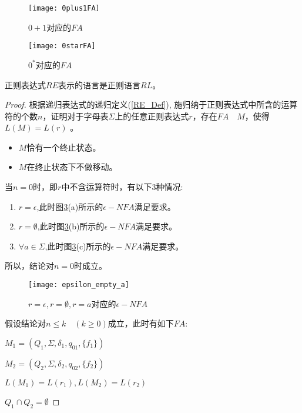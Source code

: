 \begin{figure}[htbp]
	\texttt{[image: 0plus1FA]}
	\caption{$0+1$对应的$FA$}
	\label{fig:0plus1FA}       %
\end{figure}

\begin{figure}[htbp]
	\texttt{[image: 0starFA]}
	\caption{$0^\ast$对应的$FA$}
	\label{fig:0starFA}       %
\end{figure}

\begin{theorem}
	正则表达式$RE$表示的语言是正则语言$RL$。
\end{theorem}

\begin{proof}
	根据递归表达式的递归定义(\ref{RE_Def}), 施归纳于正则表达式中所含的运算符的个数$n$，证明对于字母表$\Sigma$上的任意正则表达式$r$，存在$FA\quad M$，使得$L(M) = L(r)$ 。
	\begin{itemize}
		\item $M$恰有一个终止状态。
		\item $M$在终止状态下不做移动。
	\end{itemize}

	当$n=0$时，即$r$中不含运算符时，有以下3种情况:
	\begin{enumerate}
		\item $r=\epsilon$,此时图\ref{fig:epsilon_empty_a}(a)所示的$\epsilon -NFA$满足要求。
		\item $r=\emptyset$,此时图\ref{fig:epsilon_empty_a}(b)所示的$\epsilon -NFA$满足要求。
		\item $\forall a\in\Sigma$,此时图\ref{fig:epsilon_empty_a}(c)所示的$\epsilon -NFA$满足要求。
	\end{enumerate}

	所以，结论对$n=0$时成立。
	\begin{figure}[htbp]
		\texttt{[image: epsilon\_empty\_a]}
		\caption{$r=\epsilon,r=\emptyset,r=a$对应的$\epsilon -NFA$}
		\label{fig:epsilon_empty_a}       %
	\end{figure}
    
    假设结论对$n\le k\quad (k\ge 0)$成立，此时有如下$FA$:
    
    $M_1=(Q_1,\Sigma,\delta_1,q_{01},\{f_1\})$
    
    $M_2=(Q_2,\Sigma,\delta_2,q_{02},\{f_2\})$
    
    $L(M_1)=L(r_1), L(M_2)=L(r_2)$
    
    $Q_1\cap Q_2=\emptyset$
    

\end{proof}
